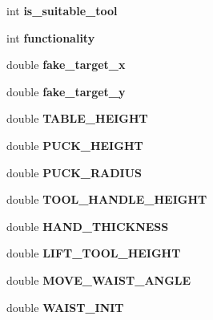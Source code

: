 \begin{DoxyCompactItemize}
int {\bfseries is\+\_\+suitable\+\_\+tool}
\item 
\mbox{\label{structManipulate_afe8996f2e5ff4dfe1056907e9605d3aa}} 
int {\bfseries functionality}
\item 
\mbox{\label{structManipulate_aea961a344c1f73018490881e2b3432a0}} 
double {\bfseries fake\+\_\+target\+\_\+x}
\item 
\mbox{\label{structManipulate_a6f34413c86bc1ad485f1ccd0744e6979}} 
double {\bfseries fake\+\_\+target\+\_\+y}
\item 
\mbox{\label{structManipulate_a4d911cf511e8fe7c9780c1010ef0f378}} 
double {\bfseries T\+A\+B\+L\+E\+\_\+\+H\+E\+I\+G\+HT}
\item 
\mbox{\label{structManipulate_a421225402a0df865a1049839c8f22a5d}} 
double {\bfseries P\+U\+C\+K\+\_\+\+H\+E\+I\+G\+HT}
\item 
\mbox{\label{structManipulate_a2b4cf92fdb789c4bb01be071f91bc38b}} 
double {\bfseries P\+U\+C\+K\+\_\+\+R\+A\+D\+I\+US}
\item 
\mbox{\label{structManipulate_a7518a44d7d3983d4c5ca2ab71be42f89}} 
double {\bfseries T\+O\+O\+L\+\_\+\+H\+A\+N\+D\+L\+E\+\_\+\+H\+E\+I\+G\+HT}
\item 
\mbox{\label{structManipulate_ae30975ad4c1d6ac874784c18f91bf2ec}} 
double {\bfseries H\+A\+N\+D\+\_\+\+T\+H\+I\+C\+K\+N\+E\+SS}
\item 
\mbox{\label{structManipulate_a35c6cf299244f8c43a4d9976a3703bcb}} 
double {\bfseries L\+I\+F\+T\+\_\+\+T\+O\+O\+L\+\_\+\+H\+E\+I\+G\+HT}
\item 
\mbox{\label{structManipulate_a345f615c2da8237e22e72ce35fa374f3}} 
double {\bfseries M\+O\+V\+E\+\_\+\+W\+A\+I\+S\+T\+\_\+\+A\+N\+G\+LE}
\item 
\mbox{\label{structManipulate_ab71418eed78ffb5dda4a1ab4a36d8fc0}} 
double {\bfseries W\+A\+I\+S\+T\+\_\+\+I\+N\+IT}

\end{DoxyCompactItemize}
